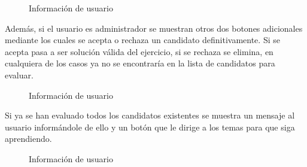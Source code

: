 \begin{figure}[H]
\begin{center}
\caption{Información de usuario\label{fig:usuario}}
\end{center}
\end{figure}

Además, si el usuario es administrador se muestran otros dos botones adicionales mediante los cuales se acepta o rechaza un candidato definitivamente. Si se acepta pasa a ser solución válida del ejercicio, si se rechaza se elimina, en cualquiera de los casos ya no se encontraría en la lista de candidatos para evaluar.

\begin{figure}[H]
\begin{center}
\caption{Información de usuario\label{fig:usuario}}
\end{center}
\end{figure}

Si ya se han evaluado todos los candidatos existentes se muestra un mensaje al usuario informándole de ello y un botón que le dirige a los temas para que siga aprendiendo.

\begin{figure}[H]
\begin{center}
\caption{Información de usuario\label{fig:usuario}}
\end{center}
\end{figure}